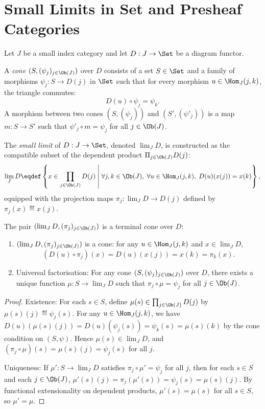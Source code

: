 \section{Small Limits in Set and Presheaf Categories}

Let $J$ be a small index category and let $D : J \to \Set$ be a diagram functor.

\begin{definition}
A \emph{cone} $(S, (\psi_j)_{j \in \Ob(J)})$ over $D$ consists of a set $S \in \Set$ and a family of morphisms $\psi_j : S \to D(j)$ in $\Set$ such that for every morphism $u \in \Hom_J(j, k)$, the triangle commutes:
\[
D(u) \circ \psi_j = \psi_k.
\]
A morphism between two cones $(S, (\psi_j))$ and $(S', (\psi'_j))$ is a map $m : S \to S'$ such that $\psi'_j \circ m = \psi_j$ for all $j \in \Ob(J)$.
\end{definition}

\begin{definition}
The \emph{small limit} of $D : J \to \Set$, denoted $\lim_J D$, is constructed as the compatible subset of the dependent product $\Pi_{j \in \Ob(J)} D(j)$:
\[
\lim_J D \eqdef \left\{ x \in \prod_{j \in \Ob(J)} D(j) \;\middle|\; \forall j, k \in \Ob(J),\; \forall u \in \Hom_J(j, k),\; D(u)(x(j)) = x(k) \right\},
\]
equipped with the projection maps $\pi_j : \lim_J D \to D(j)$ defined by $\pi_j(x) \eqdef x(j)$.
\end{definition}

\begin{theorem}
The pair $(\lim_J D, (\pi_j)_{j \in \Ob(J)})$ is a terminal cone over $D$:
\begin{enumerate}
    \item $(\lim_J D, (\pi_j)_{j \in \Ob(J)})$ is a cone: for any $u \in \Hom_J(j, k)$ and $x \in \lim_J D$,
    \[
    (D(u) \circ \pi_j)(x) = D(u)(x(j)) = x(k) = \pi_k(x).
    \]
    \item Universal factorisation: For any cone $(S, (\psi_j)_{j \in \Ob(J)})$ over $D$, there exists a unique function $\mu : S \to \lim_J D$ such that $\pi_j \circ \mu = \psi_j$ for all $j \in \Ob(J)$.
\end{enumerate}
\end{theorem}
\begin{proof}
Existence: For each $s \in S$, define $\mu(s) \in \prod_{j \in \Ob(J)} D(j)$ by $\mu(s)(j) \eqdef \psi_j(s)$. For any $u \in \Hom_J(j, k)$, we have $D(u)(\mu(s)(j)) = D(u)(\psi_j(s)) = \psi_k(s) = \mu(s)(k)$ by the cone condition on $(S, \psi)$. Hence $\mu(s) \in \lim_J D$, and $(\pi_j \circ \mu)(s) = \mu(s)(j) = \psi_j(s)$ for all $j$.

Uniqueness: If $\mu' : S \to \lim_J D$ satisfies $\pi_j \circ \mu' = \psi_j$ for all $j$, then for each $s \in S$ and each $j \in \Ob(J)$, $\mu'(s)(j) = \pi_j(\mu'(s)) = \psi_j(s) = \mu(s)(j)$. By functional extensionality on dependent products, $\mu'(s) = \mu(s)$ for all $s \in S$, so $\mu' = \mu$.
\end{proof}

